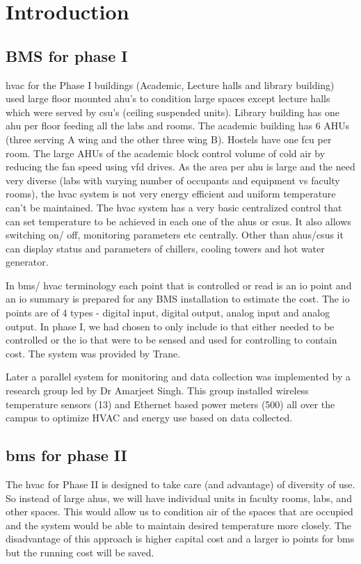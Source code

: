 \documentclass[letterpaper,11pt]{report}
\begin{document}
\newpage
\chapter{Introduction}\label{chapter:introduction}
\setcounter{page}{1}
\onehalfspacing
\section{BMS for phase I}
\ac{hvac} for the Phase I buildings (Academic, Lecture halls and library building) used large floor mounted \ac{ahu}'s to condition large spaces except lecture halls which were served by \ac{csu}'s (ceiling suspended units). Library building has one \ac{ahu} per floor feeding all the labs and rooms. The academic building has 6 AHUs (three serving A wing and the other three wing B). Hostels have one \ac{fcu} per room. The large AHUs of the academic block control volume of cold air by reducing the fan speed using \ac{vfd} drives. As the area per \ac{ahu} is large and the need very diverse (labs with varying number of occupants and equipment vs faculty rooms), the \ac{hvac} system is not very energy efficient and uniform temperature can't be maintained. The \ac{hvac} system has a very basic centralized control that can set temperature to be achieved in each one of the \ac{ahu}s or \ac{csu}s. It also allows switching on/ off, monitoring parameters etc centrally. Other than \ac{ahu}s/\ac{csu}s it can display status and parameters of chillers, cooling towers and hot water generator.
\par
In \ac{bms}/ \ac{hvac} terminology each point that is controlled or read is an \ac{io} point and an \ac{io} summary is prepared for any BMS installation to estimate the cost. The \ac{io} points are of 4 types - digital input, digital output, analog input and analog output. In phase I, we had chosen to only include \ac{io} that either needed to be controlled or the \ac{io} that were to be sensed and used for controlling to contain cost. The system was provided by Trane.
\par
Later a parallel system for monitoring and data collection was implemented by a research group led by Dr Amarjeet Singh. This group installed wireless temperature sensors (13) and Ethernet based power meters (500) all over the campus to optimize HVAC and energy use based on data collected.
\pagebreak
\section{\ac{bms} for phase II}
The \ac{hvac} for Phase II is designed to take care (and advantage) of diversity of use. So instead of large \ac{ahu}s, we will have individual units in faculty rooms, labs, and other spaces. This would allow us to condition air of the spaces that are occupied and the system would be able to maintain desired temperature more closely. The disadvantage of this approach is higher capital cost and a larger \ac{io} points for \ac{bms} but the running cost will be saved.
\end{document}
